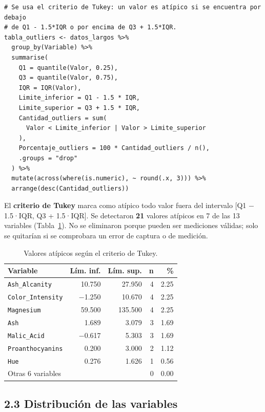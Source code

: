 \documentclass[10pt,letterpaper,twocolumn]{article}
\newcommand{\var}[1]{\texttt{#1}}
\begin{document}
\begin{lstlisting}[firstnumber=229]
# Se usa el criterio de Tukey: un valor es atípico si se encuentra por debajo
# de Q1 - 1.5*IQR o por encima de Q3 + 1.5*IQR.
tabla_outliers <- datos_largos %>%
  group_by(Variable) %>%
  summarise(
    Q1 = quantile(Valor, 0.25),
    Q3 = quantile(Valor, 0.75),
    IQR = IQR(Valor),
    Limite_inferior = Q1 - 1.5 * IQR,
    Limite_superior = Q3 + 1.5 * IQR,
    Cantidad_outliers = sum(
      Valor < Limite_inferior | Valor > Limite_superior
    ),
    Porcentaje_outliers = 100 * Cantidad_outliers / n(),
    .groups = "drop"
  ) %>%
  mutate(across(where(is.numeric), ~ round(.x, 3))) %>%
  arrange(desc(Cantidad_outliers))
\end{lstlisting}

El \textbf{criterio de Tukey} marca como atípico todo valor fuera del intervalo [Q1 − 1.5·IQR, Q3 + 1.5·IQR]. Se detectaron \textbf{21} valores atípicos en 7 de las 13 variables (Tabla~\ref{tab:outliers}). No se eliminaron porque pueden ser mediciones válidas; solo se quitarían si se comprobara un error de captura o de medición.

\begin{table}[htbp]
  \centering
  \caption{Valores atípicos según el criterio de Tukey.}
  \label{tab:outliers}
  \footnotesize
  \begin{tabular}{@{}lrrrr@{}}
    \toprule
    \textbf{Variable} & \textbf{Lím. inf.} & \textbf{Lím. sup.} & \textbf{n} & \textbf{\%} \\
    \midrule
    \var{Ash\_Alcanity}    & 10.750 & 27.950  & 4 & 2.25 \\
    \var{Color\_Intensity} & −1.250 & 10.670  & 4 & 2.25 \\
    \var{Magnesium}        & 59.500 & 135.500 & 4 & 2.25 \\
    \var{Ash}              & 1.689  & 3.079   & 3 & 1.69 \\
    \var{Malic\_Acid}      & −0.617 & 5.303   & 3 & 1.69 \\
    \var{Proanthocyanins}  & 0.200  & 3.000   & 2 & 1.12 \\
    \var{Hue}              & 0.276  & 1.626   & 1 & 0.56 \\
    \midrule
    Otras 6 variables      &        &         & 0 & 0.00 \\
    \bottomrule
  \end{tabular}
\end{table}

\subsection{2.3 Distribución de las variables}
\end{document}
